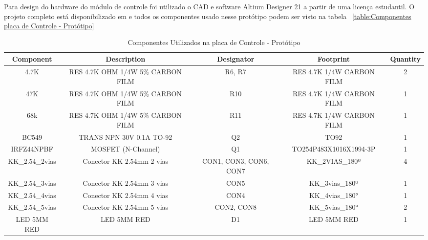 \documentclass[../delivery_hospital_report.tex]{subfiles}
\begin{document}
Para design do hardware do módulo de controle foi utilizado o CAD e software Altium Designer 21 \cite{altium21} a partir de uma licença estudantil. O projeto completo está disponibilizado em \cite{github_modulos} e todos os componentes usado nesse protótipo podem ser visto na tabela ~\ref{table:Componentes placa de Controle - Protótipo}

\begin{table}[!h]
\caption{Componentes Utilizados na placa de Controle - Protótipo}
\centering
\begin{adjustbox}{width=\columnwidth,center}
\begin{tabular}{|c|c|c|c|c|}
\hline
Component                   & Description                                  & Designator             & Footprint                 & Quantity \\ \hline
4.7K                      & RES 4.7K OHM 1/4W 5\% CARBON FILM            & R6, R7                 & RES 4.7K 1/4W CARBON FILM & 2        \\ \hline
47K                       & RES 4.7K OHM 1/4W 5\% CARBON FILM            & R10                    & RES 4.7K 1/4W CARBON FILM & 1        \\ \hline
68k                       & RES 4.7K OHM 1/4W 5\% CARBON FILM            & R11                    & RES 4.7K 1/4W CARBON FILM & 1        \\ \hline
BC549                     & TRANS NPN 30V 0.1A TO-92                     & Q2                     & TO92                      & 1        \\ \hline
IRFZ44NPBF                & MOSFET (N-Channel)                           & Q1                     & TO254P483X1016X1994-3P    & 1        \\ \hline
KK\_2.54\_2vias           & Conector KK 2.54mm 2 vias                    & CON1, CON3, CON6, CON7 & KK\_2VIAS\_180º           & 4        \\ \hline
KK\_2.54\_3vias           & Conector KK 2.54mm 3 vias                    & CON5                   & KK\_3vias\_180º           & 1        \\ \hline
KK\_2.54\_4vias           & Conector KK 2.54mm 4 vias                    & CON4                   & KK\_4vias\_180°           & 1        \\ \hline
KK\_2.54\_5vias           & Conector KK 2.54mm 5 vias                    & CON2, CON8             & KK\_5vias\_180°           & 2        \\ \hline
LED 5MM RED               & LED 5MM RED                                  & D1                     & LED 5MM RED               & 1        \\ \hline

\end{tabular}
\end{adjustbox}
\end{table}
\end{document}
